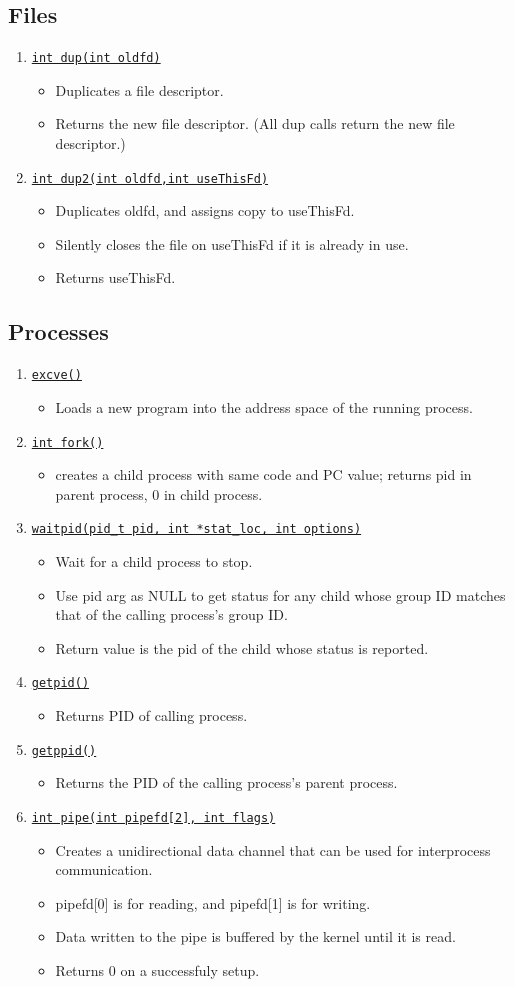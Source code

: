 \documentclass[10pt]{report}
\newcommand{\syscalldoc}[3]{
    \item \href{#2}{\texttt{#1}}
    \begin{itemize}
        #3
    \end{itemize}
}
\begin{document}
\subsection{Files}
\begin{enumerate}
\syscalldoc{int dup(int oldfd)}{https://man7.org/linux/man-pages/man2/dup.2.html}{
\item Duplicates a file descriptor.
\item Returns the new file descriptor. (All dup calls return the new file descriptor.)
}
\syscalldoc{int dup2(int oldfd,int useThisFd)}{
https://man7.org/linux/man-pages/man2/dup.2.html
}{
\item Duplicates oldfd, and assigns copy to useThisFd.
\item Silently closes the file on useThisFd if it is already in use.
\item Returns useThisFd.
}
\end{enumerate}
\subsection{Processes}
\begin{enumerate}
\syscalldoc{excve()}{...}{
\item Loads a new program into the address space of the running process.
}
\syscalldoc{int fork()}
{https://man7.org/linux/man-pages/man2/fork.2.html}{
\item creates a child process with same code and PC value; returns pid in parent process, 0 in child process.
}
\syscalldoc{waitpid(pid\_t pid, int *stat\_loc, int options)}
{https://man7.org/linux/man-pages/man3/waitpid.3p.html}{
\item Wait for a child process to stop.
\item Use pid arg as NULL to get status for any child whose group ID matches that of the calling process's group ID.
\item Return value is the pid of the child whose status is reported.
}
\syscalldoc{getpid()}{...}{
\item Returns PID of calling process.
}
\syscalldoc{getppid()}{...}{
\item Returns the PID of the calling process's parent process.
}
\syscalldoc{int pipe(int pipefd[2], int flags)}
{https://man7.org/linux/man-pages/man2/pipe.2.html}{
\item Creates a unidirectional data channel that can be used for interprocess communication.
\item pipefd[0] is for reading, and pipefd[1] is for writing.
\item Data written to the pipe is buffered by the kernel until it is read.
\item Returns 0 on a successfuly setup.
}
\end{enumerate}
\end{document}
